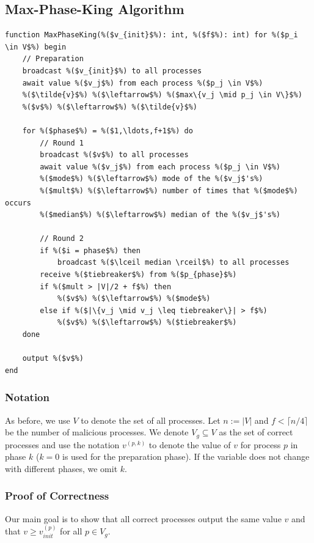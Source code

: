 \documentclass[runningheads]{llncs}
\begin{document}
\subsection{Max-Phase-King Algorithm}\label{appendix:maxphaseking}
\begin{lstlisting}
function MaxPhaseKing(%($v_{init}$%): int, %($f$%): int) for %($p_i \in V$%) begin 
    // Preparation
    broadcast %($v_{init}$%) to all processes
    await value %($v_j$%) from each process %($p_j \in V$%)
    %($\tilde{v}$%) %($\leftarrow$%) %($max\{v_j \mid p_j \in V\}$%)
    %($v$%) %($\leftarrow$%) %($\tilde{v}$%)

    for %($phase$%) = %($1,\ldots,f+1$%) do
        // Round 1
        broadcast %($v$%) to all processes
        await value %($v_j$%) from each process %($p_j \in V$%)
        %($mode$%) %($\leftarrow$%) mode of the %($v_j$'s%)
        %($mult$%) %($\leftarrow$%) number of times that %($mode$%) occurs 
        %($median$%) %($\leftarrow$%) median of the %($v_j$'s%)

        // Round 2
        if %($i = phase$%) then 
            broadcast %($\lceil median \rceil$%) to all processes 
        receive %($tiebreaker$%) from %($p_{phase}$%)
        if %($mult > |V|/2 + f$%) then 
            %($v$%) %($\leftarrow$%) %($mode$%)
        else if %($|\{v_j \mid v_j \leq tiebreaker\}| > f$%)
            %($v$%) %($\leftarrow$%) %($tiebreaker$%)
    done

    output %($v$%)
end
\end{lstlisting}

\subsubsection{Notation} As before, we use $V$ to denote the set of all processes. Let $n := |V|$ and $f < \lceil n/4 \rceil$ be the number of malicious processes. We denote $V_g \subseteq V$ as the set of correct processes and use the notation $v^{(p, k)}$ to denote the value of $v$ for process $p$ in phase $k$ ($k=0$ is used for the preparation phase). If the variable does not change with different phases, we omit $k$.

\subsubsection{Proof of Correctness} Our main goal is to show that all correct processes output the same value $v$ and that $v \geq v_{init}^{(p)}$ for all $p \in V_g$.
\end{document}
